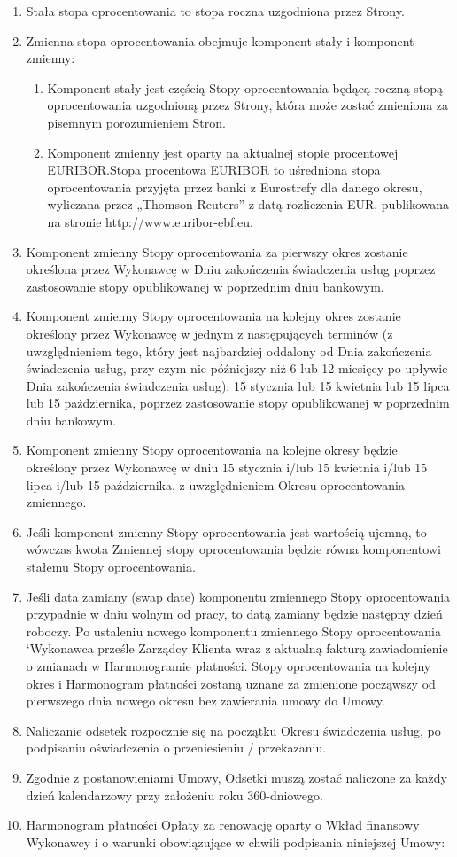 \begin{enumerate}[label=\arabic*.]
	\item Stała stopa oprocentowania to stopa roczna uzgodniona przez Strony.
	\item Zmienna stopa oprocentowania obejmuje komponent stały i komponent zmienny:
	\begin{enumerate}
		\item Komponent stały jest częścią Stopy oprocentowania będącą roczną stopą oprocentowania uzgodnioną przez Strony, która może zostać zmieniona za pisemnym porozumieniem Stron.
		\item Komponent zmienny jest oparty na aktualnej stopie procentowej EURIBOR.\@ Stopa procentowa EURIBOR to uśredniona stopa oprocentowania przyjęta przez banki z Eurostrefy dla danego okresu, wyliczana przez „Thomson Reuters” z datą rozliczenia EUR, publikowana na stronie http://www.euribor-ebf.eu.
	\end{enumerate}
	\item Komponent zmienny Stopy oprocentowania za pierwszy okres zostanie określona przez Wykonawcę w Dniu zakończenia świadczenia usług poprzez zastosowanie stopy opublikowanej w poprzednim dniu bankowym.
	\item Komponent zmienny Stopy oprocentowania na kolejny okres zostanie określony przez Wykonawcę w jednym z następujących terminów (z uwzględnieniem tego, który jest najbardziej oddalony od Dnia zakończenia świadczenia usług, przy czym nie późniejszy niż 6 lub 12 miesięcy po upływie Dnia zakończenia świadczenia usług): 15 stycznia lub 15 kwietnia lub 15 lipca lub 15 października, poprzez zastosowanie stopy opublikowanej w poprzednim dniu bankowym.
	\item Komponent zmienny Stopy oprocentowania na kolejne okresy będzie określony przez Wykonawcę w dniu 15 stycznia i/lub 15 kwietnia i/lub 15 lipca i/lub 15 października, z uwzględnieniem Okresu oprocentowania zmiennego.
	\item Jeśli komponent zmienny Stopy oprocentowania jest wartością ujemną, to wówczas kwota Zmiennej stopy oprocentowania będzie równa komponentowi stałemu Stopy oprocentowania.
	\item Jeśli data zamiany (swap date) komponentu zmiennego Stopy oprocentowania przypadnie w dniu wolnym od pracy, to datą zamiany będzie następny dzień roboczy. Po ustaleniu nowego komponentu zmiennego Stopy oprocentowania ‘Wykonawca prześle Zarządcy Klienta wraz z aktualną fakturą zawiadomienie o zmianach w Harmonogramie płatności. Stopy oprocentowania na kolejny okres i Harmonogram płatności zostaną uznane za zmienione począwszy od pierwszego dnia nowego okresu bez zawierania umowy do Umowy.
	\item Naliczanie odsetek rozpocznie się na początku Okresu świadczenia usług, po podpisaniu oświadczenia o przeniesieniu / przekazaniu.
	\item Zgodnie z postanowieniami Umowy, Odsetki muszą zostać naliczone za każdy dzień kalendarzowy przy założeniu roku 360-dniowego.
	\item Harmonogram płatności Opłaty za renowację oparty o Wkład finansowy Wykonawcy i o	warunki obowiązujące w chwili podpisania niniejszej Umowy:


\end{enumerate}
